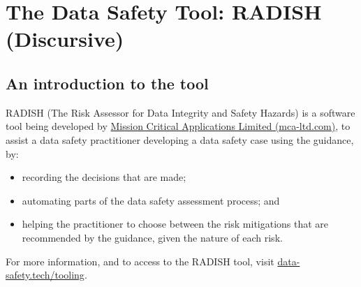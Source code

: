 %
%
\chapter{The Data Safety Tool: RADISH (Discursive)} \label{bkm:radish}

\section{An introduction to the tool}
RADISH (The Risk Assessor for Data Integrity and Safety Hazards) is a software tool being developed by \href{https://mca-ltd.com/}{Mission Critical Applications Limited (mca-ltd.com)}, to assist a data safety practitioner developing a data safety case using the guidance, by:
\begin{itemize}
  \item recording the decisions that are made;
  \item automating parts of the \gls{data safety assessment} process; and
  \item helping the practitioner to choose between the risk mitigations that are recommended by the guidance, given the nature of each risk.
\end{itemize}

For more information, and to access to the RADISH tool, visit \href{https://data-safety.tech/tooling}{data-safety.tech/tooling}.

